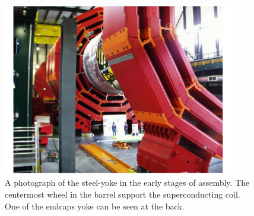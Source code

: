 \begin{figure}
 \centering
\includegraphics[width=0.9\textwidth]{CMS_DetectorFigures/Yoke.pdf}
\caption{A photograph of the steel-yoke in the early stages of
  assembly. The centermost wheel in the barrel support the
  superconducting coil. One of the endcaps yoke can be seen at the
  back.\label{fig:yoke}}
\end{figure}

